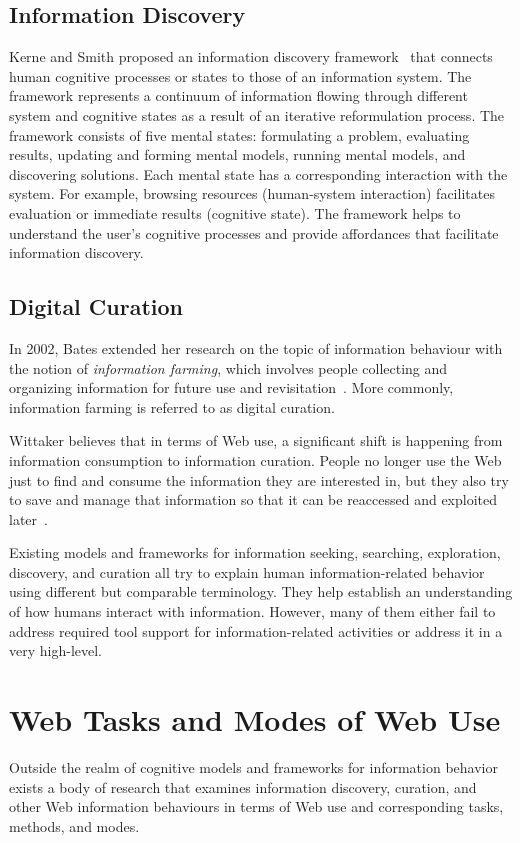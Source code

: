 {{\subsection{Information Discovery}
Kerne and Smith proposed an information discovery framework~\cite{kerne2004information} that connects human cognitive processes or states to those of an information system. The framework represents a continuum of information flowing through different system and cognitive states as a result of an iterative reformulation process. The framework consists of five mental states: formulating a problem, evaluating results, updating and forming mental models, running mental models, and discovering solutions. Each mental state has a corresponding interaction with the system. For example, browsing resources (human-system interaction) facilitates evaluation or immediate results (cognitive state). The framework helps to understand the user's cognitive processes and provide affordances that facilitate information discovery.
}
   
{\subsection{Digital Curation}
In 2002, Bates extended her research on the topic of information behaviour with the notion of \textit{information farming}, which involves people collecting and organizing information for future use and revisitation~\cite{bates2002toward}. More commonly, information farming is referred to as digital curation. 

Wittaker believes that in terms of Web use, a significant shift is happening from information consumption to information curation. People no longer use the Web just to find and consume the information they are interested in, but they also try to save and manage that information so that it can be reaccessed and exploited later~\cite{whittaker2011personal}. 

Existing models and frameworks for information seeking, searching, exploration, discovery, and curation all try to explain human information-related behavior using different but comparable terminology. They help establish an understanding of how humans interact with information. However, many of them either fail to address required tool support for information-related activities or address it in a very high-level.  

{\section{Web Tasks and Modes of Web Use}
Outside the realm of cognitive models and frameworks for information behavior exists a body of research that examines information discovery, curation, and other Web information behaviours in terms of Web use and corresponding tasks, methods, and modes.

}}}
